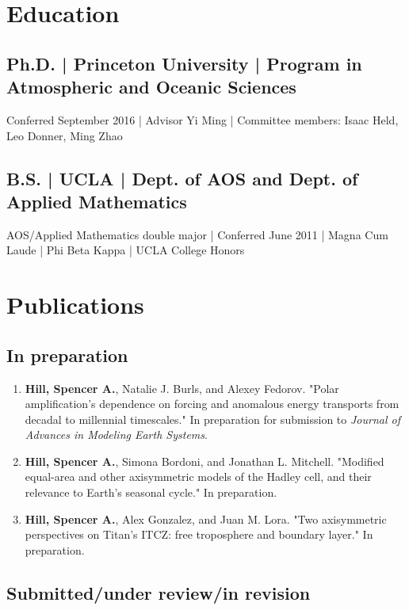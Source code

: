 \documentclass[12pt,letterpaper]{shillcv}
\begin{document}
\section*{Education}
\label{sec:org1b62f02}
\subsection*{Ph.D. | Princeton University | Program in Atmospheric and Oceanic Sciences}
\label{sec:orgc569d5e}
Conferred September 2016 | Advisor Yi Ming | Committee members: Isaac
Held, Leo Donner, Ming Zhao
\subsection*{B.S. | UCLA | Dept. of AOS and Dept. of Applied Mathematics}
\label{sec:orgdf94e06}
AOS/Applied Mathematics double major | Conferred June 2011 |
Magna Cum Laude | Phi Beta Kappa | UCLA College Honors
\section*{Publications}
\label{sec:org63ee09c}
\subsection*{In preparation}
\label{sec:org77d8a33}
\begin{enumerate}
\item \textbf{Hill, Spencer A.}, Natalie J. Burls, and Alexey Fedorov.  "Polar
amplification's dependence on forcing and anomalous energy transports from
decadal to millennial timescales."  In preparation for submission to \emph{Journal
of Advances in Modeling Earth Systems}.
\item \textbf{Hill, Spencer A.}, Simona Bordoni, and Jonathan L. Mitchell.  "Modified
equal-area and other axisymmetric models of the Hadley cell, and their
relevance to Earth's seasonal cycle."  In preparation.
\item \textbf{Hill, Spencer A.}, Alex Gonzalez, and Juan M. Lora.  "Two axisymmetric
perspectives on Titan's ITCZ: free troposphere and boundary layer."  In
preparation.
\end{enumerate}
\subsection*{Submitted/under review/in revision}
\label{sec:org50d8cb1}
\end{document}
